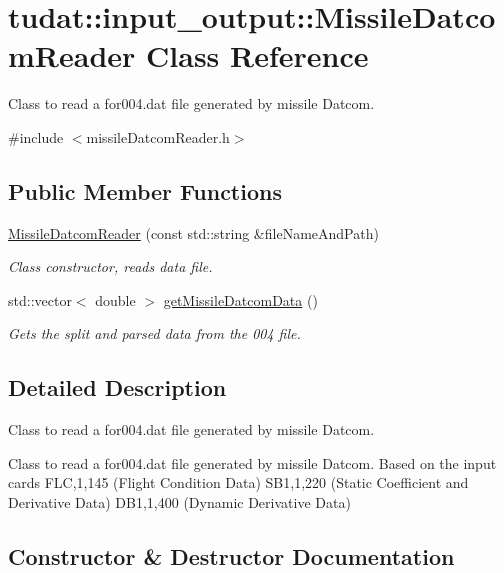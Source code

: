 \hypertarget{classtudat_1_1input__output_1_1MissileDatcomReader}{}\section{tudat\+:\+:input\+\_\+output\+:\+:Missile\+Datcom\+Reader Class Reference}
\label{classtudat_1_1input__output_1_1MissileDatcomReader}


Class to read a for004.\+dat file generated by missile Datcom.  




{\ttfamily \#include $<$missile\+Datcom\+Reader.\+h$>$}

\subsection*{Public Member Functions}
\begin{DoxyCompactItemize}
\item 
\hyperlink{classtudat_1_1input__output_1_1MissileDatcomReader_ac84988368de300fd84157238640723c9}{Missile\+Datcom\+Reader} (const std\+::string \&file\+Name\+And\+Path)
\begin{DoxyCompactList}\small\item\em Class constructor, reads data file. \end{DoxyCompactList}\item 
std\+::vector$<$ double $>$ \hyperlink{classtudat_1_1input__output_1_1MissileDatcomReader_a4970f09b9a8a1cc551503749a454d0d2}{get\+Missile\+Datcom\+Data} ()
\begin{DoxyCompactList}\small\item\em Gets the split and parsed data from the 004 file. \end{DoxyCompactList}\end{DoxyCompactItemize}


\subsection{Detailed Description}
Class to read a for004.\+dat file generated by missile Datcom. 

Class to read a for004.\+dat file generated by missile Datcom. Based on the input cards F\+LC,1,145 (Flight Condition Data) S\+B1,1,220 (Static Coefficient and Derivative Data) D\+B1,1,400 (Dynamic Derivative Data) 

\subsection{Constructor \& Destructor Documentation}

